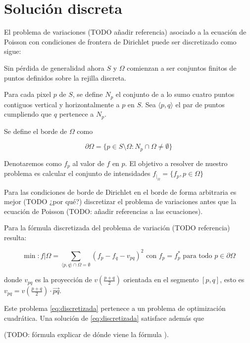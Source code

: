 \documentclass[11pt,a4paper]{article}
\begin{document}
\section{Solución discreta}

El problema de variaciones (TODO añadir referencia) asociado a la 
ecuación de Poisson con condiciones de frontera de Dirichlet puede ser discretizado como sigue: 

Sin pérdida de generalidad ahora $S$ y $\Omega$ comienzan a ser conjuntos finitos de puntos definidos
sobre la rejilla discreta. 

Para cada pixel $p$ de $S$, se define $N_p$ el conjunto de a lo sumo cuatro puntos contiguos
vertical y horizontalmente a $p$ en $S$. 
Sea  $\langle p,q\rangle$ el par de puntos cumpliendo que $q$ pertenece a $N_p$.   

Se define el borde de $\Omega$ como 

\begin{equation*}
    \partial\Omega = \{ p \in S \setminus \Omega : N_p \cap \Omega \neq  \emptyset \}
\end{equation*}

Denotaremos como $f_p$ al valor de $f$ en $p$. El objetivo a resolver de nuestro problema es 
calcular el conjunto de intensidades $f_{|_{\Omega}} = \{ f_p, p \in \Omega\}$

Para las condiciones de borde de Dirichlet en el borde de forma arbitraria es mejor (TODO ¿por qué?)
discretizar el problema de variaciones antes que la ecuación de Poisson (TODO: añadir referencias a las ecuaciones). 

Para la fórmula discretizada del problema de variación (TODO referencia) resulta: 

\begin{equation}\label{eq:discretizada}
    \min: { f|\Omega} = \sum_{ \langle p,q\rangle \cap \Omega = \emptyset} (f_p - f_q - v_{pq})^2 \text{ con } f_p = f^*_p \text{ para todo } p \in \partial \Omega
\end{equation}

donde $v_{pq}$ es la proyección de $v(\frac{p+q}{2})$ orientada en el segmento 
$\left[ p,q \right]$, 
esto es $v_{pq} = v(\frac{p+q}{2})\cdot  \overrightarrow{pq}$. 

Este problema \ref{eq:discretizada} pertenece a un problema de optimización cuadrática. 
Una solución de \ref{eq:discretizada} satisface además que 

(TODO: fórmula explicar de dónde viene la fórmula ). 
\end{document}
